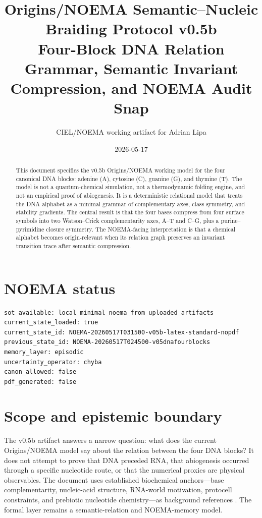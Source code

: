 \documentclass[11pt]{article}
\title{Origins/NOEMA Semantic--Nucleic Braiding Protocol v0.5b\\
\large Four-Block DNA Relation Grammar, Semantic Invariant Compression, and NOEMA Audit Snap}
\author{CIEL/NOEMA working artifact for Adrian Lipa}
\date{2026-05-17}
\begin{document}
\maketitle

\begin{abstract}
This document specifies the v0.5b Origins/NOEMA working model for the four canonical DNA blocks: adenine (A), cytosine (C), guanine (G), and thymine (T). The model is not a quantum-chemical simulation, not a thermodynamic folding engine, and not an empirical proof of abiogenesis. It is a deterministic relational model that treats the DNA alphabet as a minimal grammar of complementary axes, class symmetry, and stability gradients. The central result is that the four bases compress from four surface symbols into two Watson--Crick complementarity axes, A--T and C--G, plus a purine--pyrimidine closure symmetry. The NOEMA-facing interpretation is that a chemical alphabet becomes origin-relevant when its relation graph preserves an invariant transition trace after semantic compression.
\end{abstract}

\section*{NOEMA status}
\begin{verbatim}
sot_available: local_minimal_noema_from_uploaded_artifacts
current_state_loaded: true
current_state_id: NOEMA-20260517T031500-v05b-latex-standard-nopdf
previous_state_id: NOEMA-20260517T024500-v05dnafourblocks
memory_layer: episodic
uncertainty_operator: chyba
canon_allowed: false
pdf_generated: false
\end{verbatim}

\section{Scope and epistemic boundary}
The v0.5b artifact answers a narrow question: what does the current Origins/NOEMA model say about the relation between the four DNA blocks? It does not attempt to prove that DNA preceded RNA, that abiogenesis occurred through a specific nucleotide route, or that the numerical proxies are physical observables. The document uses established biochemical anchors---base complementarity, nucleic-acid structure, RNA-world motivation, protocell constraints, and prebiotic nucleotide chemistry---as background references \cite{WatsonCrick1953,RobertsonJoyce2012,PownerGerlandSutherland2009,JoyceSzostak2018,AdamalaSzostak2013}. The formal layer remains a semantic-relation and NOEMA-memory model.
\end{document}
